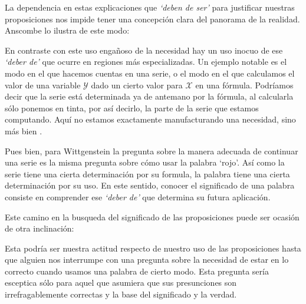 La dependencia en estas explicaciones que \emph{`deben de ser'} para justificar
nuestras proposiciones nos impide tener una concepción clara del panorama de la
realidad. Anscombe lo ilustra de este modo:

En contraste con este uso engañoso de la necesidad hay un uso inocuo de ese
\emph{`deber de'} que ocurre en regiones más especializadas. Un ejemplo
notable es el modo en el que hacemos cuentas en una serie, o el modo en el que
calculamos el valor de una variable $\mathcal{Y}$ dado un cierto valor para
$\mathcal{X}$ en una fórmula. Podríamos decir que la serie está determinada ya
de antemano por la fórmula, al calcularla sólo ponemos en tinta, por así
decirlo, la parte de la serie que estamos computando. Aquí no estamos
exactamente manufacturando una necesidad, sino más bien
.

Pues bien, para Wittgenstein la pregunta sobre la manera adecuada de continuar
una serie es la misma pregunta sobre cómo usar la palabra `rojo'. Así como la
serie tiene una cierta determinación por su formula, la palabra tiene una cierta
determinación por su uso. En este sentido, conocer el significado de una palabra
consiste en comprender ese \emph{`deber de'} que determina su futura aplicación.

Este camino en la busqueda del significado de las proposiciones puede ser
ocasión de otra inclinación:

Esta podría ser nuestra actitud respecto de nuestro uso de las proposiciones
hasta que alguien nos interrumpe con una pregunta sobre la necesidad de estar en
lo correcto cuando usamos una palabra de cierto modo. Esta pregunta sería
esceptica sólo para aquel que asumiera que sus presunciones son
irrefragablemente correctas y la base del significado y la
verdad.\autocite[cfr.~][p.~186]{twocuts}

